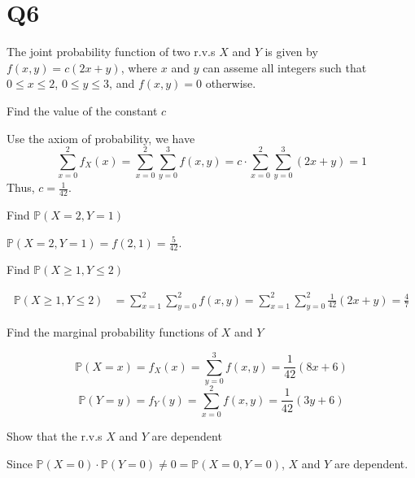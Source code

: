 \documentclass[11pt]{article}
\begin{document}
\section*{Q6}
The joint probability function of two r.v.s $X$ and $Y$ is given by 
$f(x,y)=c(2x+y)$, where $x$ and $y$ can asseme all integers such that 
$0\le x\le 2$, $0\le y\le 3$, and $f(x,y)=0$ otherwise.
\begin{qparts}
    
    \item Find the value of the constant $c$
    \begin{solution}
        Use the axiom of probability, we have $$\sum_{x=0}^{2}f_{X}(x)
        =\sum_{x=0}^{2}\sum_{y=0}^{3}f(x,y)
        =c\cdot \sum_{x=0}^{2}\sum_{y=0}^{3} (2x+y)=1$$
        Thus, $c=\frac{1}{42}$.
    \end{solution}
    
    \item Find $\mathbb{P}(X=2,Y=1)$
    \begin{solution}
        $\mathbb{P}(X=2,Y=1)=f(2,1)=\frac{5}{42}$.
    \end{solution}
    
    \item Find $\mathbb{P}(X\ge 1,Y\le 2)$
    \begin{solution}
        \begin{align*}
          \mathbb{P}(X\ge 1,Y\le 2)&=\sum_{x=1}^{2}\sum_{y=0}^{2}f(x,y)=\sum_{x=1}^{2}\sum_{y=0}^{2}\frac{1}{42}(2x+y)=\frac{4}{7}
        \end{align*}
    \end{solution}

    
    \item Find the marginal probability functions of $X$ and $Y$
    \begin{solution}
        \begin{equation*}
          \mathbb{P}(X=x)=f_{X}(x)=\sum_{y=0}^{3}f(x,y)=\frac{1}{42}(8x+6)
        \end{equation*}
        \begin{equation*}
          \mathbb{P}(Y=y)=f_{Y}(y)=\sum_{x=0}^{2}f(x,y)=\frac{1}{42}(3y+6)
        \end{equation*}
    \end{solution}
    
    \item Show that the r.v.s $X$ and $Y$ are dependent
    \begin{solution}
        Since $\mathbb{P}(X=0)\cdot \mathbb{P}(Y=0)\neq 0=\mathbb{P}(X=0,Y=0)$, $X$ and $Y$ are 
        dependent.
    \end{solution}
    

\end{qparts}
\end{document}
